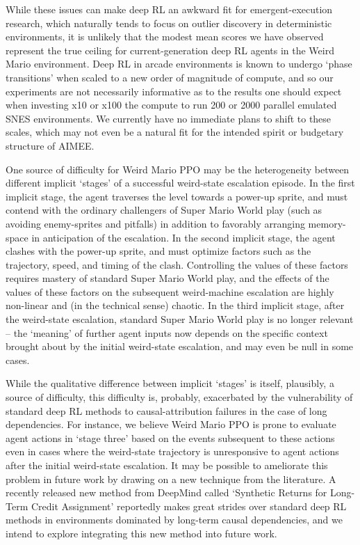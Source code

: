 \documentclass[]{article}
\begin{document}
While these issues can make deep RL an awkward fit for
emergent-execution research, which naturally tends to focus on outlier
discovery in deterministic environments, it is unlikely that the modest
mean scores we have observed represent the true ceiling for
current-generation deep RL agents in the Weird Mario environment. Deep
RL in arcade environments is known to undergo `phase transitions' when
scaled to a new order of magnitude of compute, and so our experiments
are not necessarily informative as to the results one should expect when
investing x10 or x100 the compute to run 200 or 2000 parallel emulated
SNES environments. We currently have no immediate plans to shift to
these scales, which may not even be a natural fit for the intended
spirit or budgetary structure of AIMEE.

One source of difficulty for Weird Mario PPO may be the heterogeneity
between different implicit `stages' of a successful weird-state
escalation episode. In the first implicit stage, the agent traverses the
level towards a power-up sprite, and must contend with the ordinary
challengers of Super Mario World play (such as avoiding enemy-sprites
and pitfalls) in addition to favorably arranging memory-space in
anticipation of the escalation. In the second implicit stage, the agent
clashes with the power-up sprite, and must optimize factors such as the
trajectory, speed, and timing of the clash. Controlling the values of
these factors requires mastery of standard Super Mario World play, and
the effects of the values of these factors on the subsequent
weird-machine escalation are highly non-linear and (in the technical
sense) chaotic. In the third implicit stage, after the weird-state
escalation, standard Super Mario World play is no longer relevant -- the
`meaning' of further agent inputs now depends on the specific context
brought about by the initial weird-state escalation, and may even be
null in some cases.

While the qualitative difference between implicit `stages' is itself,
plausibly, a source of difficulty, this difficulty is, probably,
exacerbated by the vulnerability of standard deep RL methods to
causal-attribution failures in the case of long dependencies. For
instance, we believe Weird Mario PPO is prone to evaluate agent actions
in `stage three' based on the events subsequent to these actions even in
cases where the weird-state trajectory is unresponsive to agent actions
after the initial weird-state escalation. It may be possible to
ameliorate this problem in future work by drawing on a new technique
from the literature. A recently released new method from DeepMind called
`Synthetic Returns for Long-Term Credit Assignment' reportedly makes
great strides over standard deep RL methods in environments dominated by
long-term causal dependencies, and we intend to explore integrating this
new method into future work.
\end{document}
